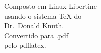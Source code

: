 \cleardoublepage
\thispagestyle{empty}
	\begin{center}
	\vspace*{\fill}
	\vspace*{\fill}
	\end{center}

\cleardoublepage
\thispagestyle{empty}
\vspace*{\fill}
	\begin{flushright}
	{\large 
	Composto em Linux Libertine\\
	usando o sistema \TeX{} do\\
	Dr.~Donald Knuth. \\
	Convertido para .pdf \\
	pelo pdflatex.\\}
	\end{flushright}
